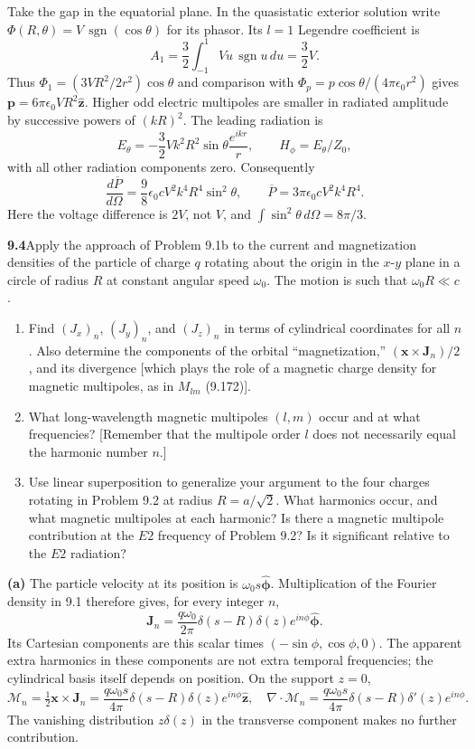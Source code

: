 Take the gap in the equatorial plane. In the quasistatic exterior solution
write $\Phi(R,\theta)=V\,\operatorname{sgn}(\cos\theta)$ for its phasor.
Its $l=1$ Legendre coefficient is
\[
A_1=\frac32\int_{-1}^1Vu\,\operatorname{sgn}u\,du=\frac32V.
\]
Thus $\Phi_1=(3VR^2/2r^2)\cos\theta$ and comparison with
$\Phi_p=p\cos\theta/(4\pi\epsilon_0r^2)$ gives
$\mathbf p=6\pi\epsilon_0VR^2\hat{\mathbf z}$.
Higher odd electric multipoles are smaller in radiated amplitude by
successive powers of $(kR)^2$. The leading radiation is
\[
E_\theta=-\frac32Vk^2R^2\sin\theta\frac{e^{ikr}}r,
\qquad H_\phi=E_\theta/Z_0,
\]
with all other radiation components zero. Consequently
\[
\boxed{\frac{d\overline P}{d\Omega}
=\frac98\epsilon_0cV^2k^4R^4\sin^2\theta,
\qquad \overline P=3\pi\epsilon_0cV^2k^4R^4.}
\]
Here the voltage difference is $2V$, not $V$, and
$\int\sin^2\theta\,d\Omega=8\pi/3$.

\par\bigskip
\noindent\textbf{9.4}\quad Apply the approach of Problem 9.1b to the current and magnetization densities of the particle of charge $q$ rotating about the origin in the $x$-$y$ plane in a circle of radius $R$ at constant angular speed $\omega_{0}$. The motion is such that $\omega_{0}R\ll c$.
\begin{enumerate}
\item[(a)] Find $(J_{x})_{n}$, $(J_{y})_{n}$, and $(J_{z})_{n}$ in terms of cylindrical coordinates for all $n$. Also determine the components of the orbital ``magnetization,'' $(\mathbf{x}\times\mathbf{J}_{n})/2$, and its divergence [which plays the role of a magnetic charge density for magnetic multipoles, as in $M_{lm}$ (9.172)].
\item[(b)] What long-wavelength magnetic multipoles $(l,m)$ occur and at what frequencies? [Remember that the multipole order $l$ does not necessarily equal the harmonic number $n$.]
\item[(c)] Use linear superposition to generalize your argument to the four charges rotating in Problem 9.2 at radius $R=a/\sqrt{2}$. What harmonics occur, and what magnetic multipoles at each harmonic? Is there a magnetic multipole contribution at the $E2$ frequency of Problem 9.2? Is it significant relative to the $E2$ radiation?
\end{enumerate}
\solution

\textbf{(a)} The particle velocity at its position is
$\omega_0s\hat{\boldsymbol\phi}$. Multiplication of the Fourier density
in 9.1 therefore gives, for every integer $n$,
\[
\mathbf J_n=\frac{q\omega_0}{2\pi}\delta(s-R)\delta(z)e^{in\phi}
\hat{\boldsymbol\phi}.
\]
Its Cartesian components are this scalar times $(-\sin\phi,\cos\phi,0)$.
The apparent extra harmonics in these components are not extra temporal
frequencies; the cylindrical basis itself depends on position.
On the support $z=0$,
\[
\mathcal M_n=\tfrac12\mathbf x\times\mathbf J_n
=\frac{q\omega_0s}{4\pi}\delta(s-R)\delta(z)e^{in\phi}\hat{\mathbf z},
\quad
\nabla\cdot\mathcal M_n
=\frac{q\omega_0s}{4\pi}\delta(s-R)\delta'(z)e^{in\phi}.
\]
The vanishing distribution $z\delta(z)$ in the transverse component
makes no further contribution.

